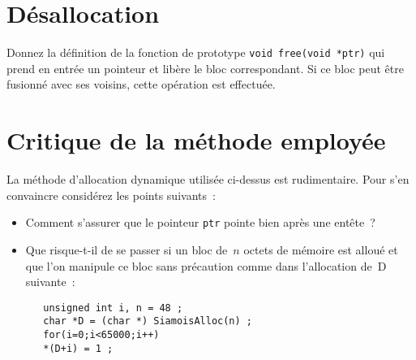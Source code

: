 \documentclass[a4paper]{article}
\begin{document}
\section{D\'esallocation}
 Donnez la d\'efinition de la fonction de prototype %
  \verb+void free(void *ptr)+ qui prend en entr\'ee un pointeur et
  lib\`ere le bloc correspondant. Si ce bloc peut \^etre fusionn\'e
  avec ses voisins, cette op\'eration est effectu\'ee.

\section{Critique de la m\'ethode employ\'ee}
La m\'ethode d'allocation dynamique utilis\'ee ci-dessus est
rudimentaire. Pour s'en convaincre consid\'erez les points suivants~:
\begin{itemize}
\item Comment s'assurer que le pointeur \verb+ptr+ pointe bien apr\`es
  une ent\^ete~?
\item Que risque-t-il de se passer si un bloc de~$n$ octets de
  m\'emoire est allou\'e et que l'on manipule ce bloc sans
  pr\'ecaution comme dans l'allocation de~D suivante~:
\begin{verbatim}
   unsigned int i, n = 48 ; 
   char *D = (char *) SiamoisAlloc(n) ;
   for(i=0;i<65000;i++)
   *(D+i) = 1 ;
\end{verbatim}
  \end{itemize}
\end{document}
